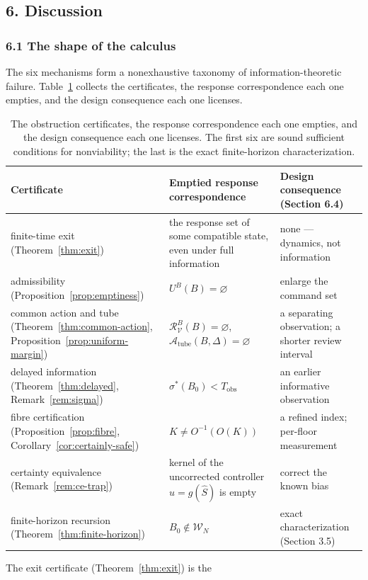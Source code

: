 \documentclass[10pt,twocolumn]{article}
\theoremstyle{definition}
\begin{document}
\subsection{6. Discussion}\label{discussion}


\subsubsection{6.1 The shape of the
calculus}\label{the-shape-of-the-calculus}

The six mechanisms form a nonexhaustive taxonomy of information-theoretic failure. Table~\ref{tab:summary} collects the certificates, the response correspondence each one empties, and the design consequence each one licenses.

\begin{table}[t]
\centering
\footnotesize
\begin{tabular}{@{}l>{\raggedright\arraybackslash}p{3.4cm}>{\raggedright\arraybackslash}p{4.4cm}@{}}
\toprule
Certificate & Emptied response correspondence & Design consequence (Section 6.4) \\
\midrule
finite-time exit (Theorem~\ref{thm:exit}) & the response set of some compatible state, even under full information & none --- dynamics, not information \\
admissibility (Proposition~\ref{prop:emptiness}) & \(U^B(B)=\varnothing\) & enlarge the command set \\
common action and tube (Theorem~\ref{thm:common-action}, Proposition~\ref{prop:uniform-margin}) & \(\mathcal{R}_{\mathcal{V}}^B(B)=\varnothing\), \(\mathcal{A}_{\mathrm{tube}}(B,\Delta)=\varnothing\) & a separating observation; a shorter review interval \\
delayed information (Theorem~\ref{thm:delayed}, Remark~\ref{rem:sigma}) & \(\sigma^*(B_0)<T_{\mathrm{obs}}\) & an earlier informative observation \\
fibre certification (Proposition~\ref{prop:fibre}, Corollary~\ref{cor:certainly-safe}) & \(K\neq O^{-1}(O(K))\) & a refined index; per-floor measurement \\
certainty equivalence (Remark~\ref{rem:ce-trap}) & kernel of the uncorrected controller \(u=g(\hat S)\) is empty & correct the known bias \\
finite-horizon recursion (Theorem~\ref{thm:finite-horizon}) & \(B_0\notin\mathcal{W}_N\) & exact characterization (Section 3.5) \\
\bottomrule
\end{tabular}
\caption{The obstruction certificates, the response correspondence each one empties, and the design consequence each one licenses. The first six are sound sufficient conditions for nonviability; the last is the exact finite-horizon characterization.}
\label{tab:summary}
\end{table} The exit certificate (Theorem~\ref{thm:exit}) is the
\end{document}
